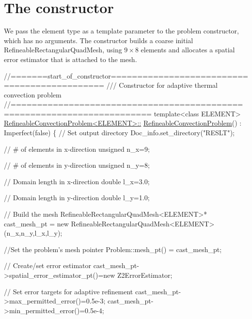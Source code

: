  

\hypertarget{index_const}{}\section{The constructor}\label{index_const}
We pass the element type as a template parameter to the problem constructor, which has no arguments. The constructor builds a coarse initial {\ttfamily Refineable\+Rectangular\+Quad\+Mesh}, using $ 9 \times 8 $ elements and allocates a spatial error estimator that is attached to the mesh.

 
\begin{DoxyCodeInclude}
\textcolor{comment}{//=======start\_of\_constructor=============================================}
\textcolor{comment}{/// Constructor for adaptive thermal convection problem}
\textcolor{comment}{}\textcolor{comment}{//========================================================================}
\textcolor{keyword}{template}<\textcolor{keyword}{class} ELEMENT>
\hyperlink{classRefineableConvectionProblem_a97e661986093402bf55fb6c32b782ddc}{RefineableConvectionProblem<ELEMENT>::}
\hyperlink{classRefineableConvectionProblem_a97e661986093402bf55fb6c32b782ddc}{RefineableConvectionProblem}() : Imperfect(false)
\{ 
 \textcolor{comment}{// Set output directory}
 Doc\_info.set\_directory(\textcolor{stringliteral}{"RESLT"});
 
 \textcolor{comment}{// # of elements in x-direction}
 \textcolor{keywordtype}{unsigned} n\_x=9;

 \textcolor{comment}{// # of elements in y-direction}
 \textcolor{keywordtype}{unsigned} n\_y=8;

 \textcolor{comment}{// Domain length in x-direction}
 \textcolor{keywordtype}{double} l\_x=3.0;

 \textcolor{comment}{// Domain length in y-direction}
 \textcolor{keywordtype}{double} l\_y=1.0;
 
 \textcolor{comment}{// Build the mesh}
 RefineableRectangularQuadMesh<ELEMENT>* cast\_mesh\_pt =
  \textcolor{keyword}{new} RefineableRectangularQuadMesh<ELEMENT>(n\_x,n\_y,l\_x,l\_y);

 \textcolor{comment}{//Set the problem's mesh pointer}
 Problem::mesh\_pt() = cast\_mesh\_pt;


 \textcolor{comment}{// Create/set error estimator}
 cast\_mesh\_pt->spatial\_error\_estimator\_pt()=\textcolor{keyword}{new} Z2ErrorEstimator;

 \textcolor{comment}{// Set error targets for adaptive refinement}
 cast\_mesh\_pt->max\_permitted\_error()=0.5e-3; 
 cast\_mesh\_pt->min\_permitted\_error()=0.5e-4; 

\end{DoxyCodeInclude}


